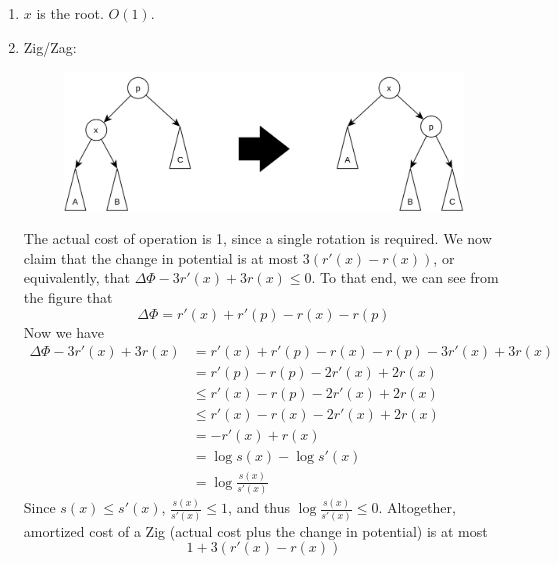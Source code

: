 \documentclass[12pt]{article}
\begin{document}
\begin{enumerate}
  \item $x$ is the root. $O(1)$.
  \item Zig/Zag:
  \begin{figure}[!ht]
    \centering
    \includegraphics[scale=0.2]{pics/splay_tree/zig2}
  \end{figure}

  The actual cost of operation is 1, since a single rotation is required. We now claim that the change in potential is at most $3(r'(x) - r(x))$, or equivalently, that $\Delta\Phi - 3r'(x) + 3r(x) \leq 0$. To that end, we can see from the figure that
  \[ \Delta\Phi = r'(x) + r'(p) - r(x) - r(p) \]
  Now we have
  \begin{align*}
    \Delta\Phi - 3r'(x) + 3r(x) &= r'(x) + r'(p) - r(x) - r(p) - 3r'(x) + 3r(x) \\
    &= r'(p) - r(p) - 2r'(x) + 2r(x) \\
    &\leq r'(x) - r(p) - 2r'(x) + 2r(x) \\
    &\leq r'(x) - r(x) - 2r'(x) + 2r(x) \\
    &= -r'(x) + r(x) \\
    &= \log s(x) - \log s'(x) \\
    &= \log \frac{s(x)}{s'(x)}
  \end{align*}
  Since $s(x) \leq s'(x)$, $\frac{s(x)}{s'(x)} \leq 1$, and thus $\log \frac{s(x)}{s'(x)} \leq 0$. Altogether, amortized cost of a Zig (actual cost plus the change in potential) is at most
  \[ 1 + 3(r'(x) - r(x)) \]


\end{enumerate}
\end{document}
